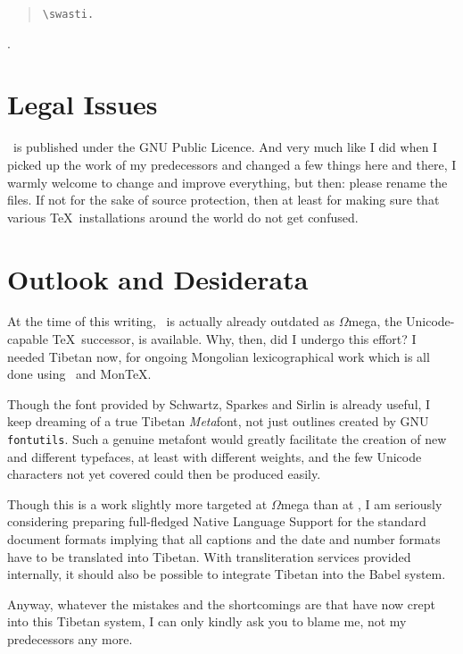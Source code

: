\documentclass[a4paper,11pt]{article}
\begin{document}
\begin{quote}
\verb*-\swasti. - \brahmastory
\end{quote}

\renewcommand{\Kcommand}{\K}
{\tib\swasti. \brahmastory}

\section{Legal Issues}

\TibTeX\ is published under the GNU Public Licence. And very much like
I did when I picked up the work of my predecessors and changed a few
things here and there, I warmly welcome to change and improve everything,
but then: please rename the files. If not for the sake of source protection,
then at least for making sure that various \TeX\ installations around the
world do not get confused.

\section{Outlook and Desiderata}

At the time of this writing, \TibTeX\ is actually already
outdated as $\Omega$mega, the Unicode-capable \TeX\ successor, is 
available. Why, then, did I undergo this effort? I needed Tibetan now,
for ongoing Mongolian lexicographical work which is all done using
\LaTeXe\ and Mon\TeX.

Though the font provided by Schwartz, Sparkes and Sirlin is already
useful, I keep dreaming of a true Tibetan \emph{Meta}font, not just
outlines created by GNU \texttt{fontutils}. Such a genuine metafont
would greatly facilitate the creation of new and different typefaces,
at least with different weights, and the few Unicode characters not
yet covered could then be produced easily.

Though this is a work slightly more targeted at $\Omega$mega than at
\LaTeXe, I am seriously considering preparing full-fledged Native
Language Support for the standard document formats implying that all
captions and the date and number formats have to be translated into
Tibetan. With transliteration services provided internally, it should
also be possible to integrate Tibetan into the Babel system.

Anyway, whatever the mistakes and the shortcomings are that have now
crept into this Tibetan system, I can only kindly ask you to blame me,
not my predecessors any more.
\end{document}
